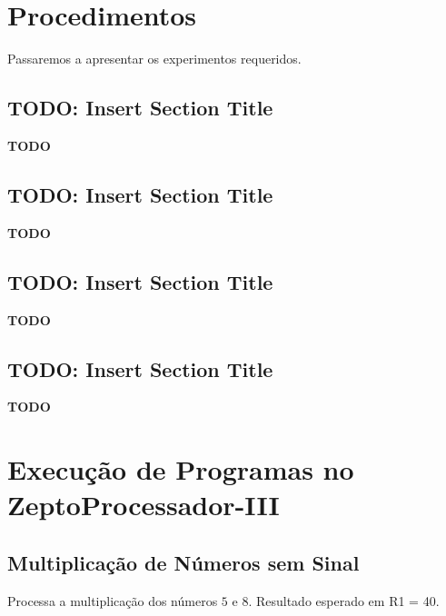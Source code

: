 \documentclass[12pt]{article}
\begin{document}
\section{Procedimentos}\label{sec:Procedimentos}

Passaremos a apresentar os experimentos requeridos.

\subsection{\textbf{TODO: Insert Section Title}}\label{sec:2.1}

\textbf{TODO}

\subsection{\textbf{TODO: Insert Section Title}}\label{sec:2.2}

\textbf{TODO}

\subsection{\textbf{TODO: Insert Section Title}}\label{sec:2.3}

\textbf{TODO}

\subsection{\textbf{TODO: Insert Section Title}}\label{sec:2.4}

\textbf{TODO}

\section{Execução de Programas no ZeptoProcessador-III}\label{sec:programs}

\subsection{Multiplicação de Números sem Sinal}\label{sec:programs:multu}

Processa a multiplicação dos números $5$ e $8$. Resultado esperado em R1 = 40.
\end{document}
